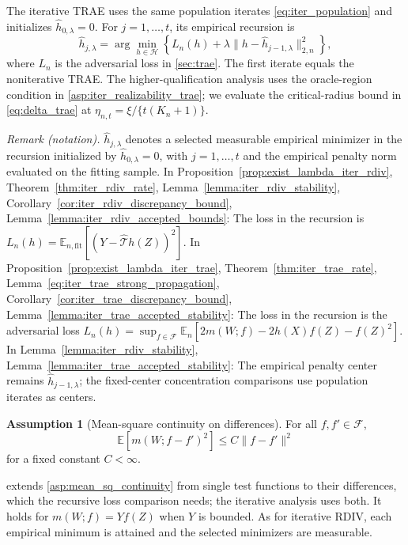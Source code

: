 \documentclass[12pt]{article}
\theoremstyle{plain}
\theoremstyle{definition}
\newtheorem{assumption}[theorem]{Assumption}
\theoremstyle{remark}
\begin{document}
The iterative TRAE uses the same population iterates \eqref{eq:iter_population} and initializes $\hat h_{0,\lambda}=0$. For $j=1,\ldots,t$, its empirical recursion is
\[
\hat h_{j,\lambda}=\arg\min_{h\in\mathcal H}\left\{L_n(h)+\lambda\|h-\hat h_{j-1,\lambda}\|_{2,n}^2\right\},
\]
where $L_n$ is the adversarial loss in \cref{sec:trae}. The first iterate equals the noniterative TRAE. The higher-qualification analysis uses the oracle-region condition in \cref{asp:iter_realizability_trae}; we evaluate the critical-radius bound in \eqref{eq:delta_trae} at $\eta_{n,t}=\xi/\{t(K_n+1)\}$.

\noindent\textit{Remark (notation).} $\hat h_{j,\lambda}$ denotes a selected measurable empirical minimizer in the recursion initialized by $\hat h_{0,\lambda}=0$, with $j=1,\ldots,t$ and the empirical penalty norm evaluated on the fitting sample. In Proposition~\ref{prop:exist_lambda_iter_rdiv}, Theorem~\ref{thm:iter_rdiv_rate}, Lemma~\ref{lemma:iter_rdiv_stability}, Corollary~\ref{cor:iter_rdiv_discrepancy_bound}, Lemma~\ref{lemma:iter_rdiv_accepted_bounds}: The loss in the recursion is $L_n(h)=\mathbb E_{n,\mathrm{fit}}[(Y-\hat{\mathcal T}h(Z))^2]$. In Proposition~\ref{prop:exist_lambda_iter_trae}, Theorem~\ref{thm:iter_trae_rate}, Lemma~\ref{eq:iter_trae_strong_propagation}, Corollary~\ref{cor:iter_trae_discrepancy_bound}, Lemma~\ref{lemma:iter_trae_accepted_stability}: The loss in the recursion is the adversarial loss $L_n(h)=\sup_{f\in\mathcal F}\mathbb E_n[2m(W;f)-2h(X)f(Z)-f(Z)^2]$. In Lemma~\ref{lemma:iter_rdiv_stability}, Lemma~\ref{lemma:iter_trae_accepted_stability}: The empirical penalty center remains $\hat h_{j-1,\lambda}$; the fixed-center concentration comparisons use population iterates as centers.


\begin{assumption}[Mean-square continuity on differences]\label{asp:iter_mean_sq_continuity}
For all $f,f'\in\mathcal F$,
\[
\mathbb{E}\left[m(W;f-f')^{2}\right]\leqslant C\|f-f'\|^{2}
\]
for a fixed constant $C<\infty$.
\end{assumption}
 extends \cref{asp:mean_sq_continuity} from single test functions to their differences, which the recursive loss comparison needs; the iterative analysis uses both. It holds for $m(W;f)=Yf(Z)$ when $Y$ is bounded. As for iterative RDIV, each empirical minimum is attained and the selected minimizers are measurable.
\end{document}
